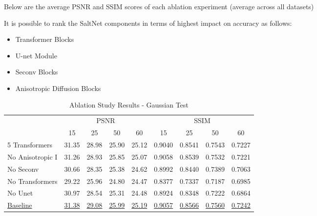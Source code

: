 Below are the average PSNR and SSIM scores of each ablation experiment (average across all datasets)

It is possible to rank the SaltNet components in terms of highest impact on accuracy as follows:

\begin{itemize}
\item Transformer Blocks
\item U-net Module
\item Seconv Blocks
\item Anisotropic Diffusion Blocks
\end{itemize}

\begin{table}[!hbt]
    \centering
    \caption{Ablation Study Results - Gaussian Test}
    \begin{tabular}{lcccccccc}
    \toprule
     & \multicolumn{4}{c}{PSNR} & \multicolumn{4}{c}{SSIM} \\
    \cmidrule(lr){2-5} \cmidrule(lr){6-9}
     & 15 & 25 & 50 & 60 & 15 & 25 & 50 & 60 \\
    \midrule
    5 Transformers & 31.35 & 28.98 & 25.90 & 25.12 & 0.9040 & 0.8541 & 0.7543 & 0.7227 \\
    No Anisotropic I & 31.26 & 28.93 & 25.85 & 25.07 & 0.9058 & 0.8539 & 0.7532 & 0.7221 \\
    No Seconv & 30.66 & 28.35 & 25.38 & 24.62 & 0.8992 & 0.8440 & 0.7389 & 0.7063 \\
    No Transformers & 29.22 & 25.96 & 24.80 & 24.47 & 0.8377 & 0.7337 & 0.7187 & 0.6985 \\
    No Unet & 30.97 & 28.54 & 25.31 & 24.48 & 0.8924 & 0.8348 & 0.7222 & 0.6864 \\
    \underline{Baseline} & \underline{31.38} & \underline{29.08} & \underline{25.99} & \underline{25.19} & \underline{0.9057} & \underline{0.8566} & \underline{0.7560} & \underline{0.7242} \\
    \bottomrule
    \end{tabular}
\end{table}

